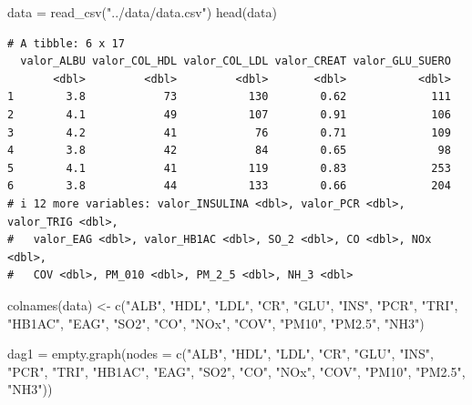 \documentclass[
  11pt,
  a4paper,
]{article}
\newenvironment{Shaded}{\begin{snugshade}}{\end{snugshade}}
\newcommand{\AttributeTok}[1]{\textcolor[rgb]{0.40,0.45,0.13}{#1}}
\newcommand{\FunctionTok}[1]{\textcolor[rgb]{0.28,0.35,0.67}{#1}}
\newcommand{\NormalTok}[1]{\textcolor[rgb]{0.00,0.23,0.31}{#1}}
\newcommand{\OtherTok}[1]{\textcolor[rgb]{0.00,0.23,0.31}{#1}}
\newcommand{\StringTok}[1]{\textcolor[rgb]{0.13,0.47,0.30}{#1}}
\begin{document}
\begin{Shaded}
\begin{Highlighting}[numbers=left,,]
\NormalTok{data }\OtherTok{=} \FunctionTok{read\_csv}\NormalTok{(}\StringTok{"../data/data.csv"}\NormalTok{)}
\FunctionTok{head}\NormalTok{(data)}
\end{Highlighting}
\end{Shaded}

\begin{verbatim}
# A tibble: 6 x 17
  valor_ALBU valor_COL_HDL valor_COL_LDL valor_CREAT valor_GLU_SUERO
       <dbl>         <dbl>         <dbl>       <dbl>           <dbl>
1        3.8            73           130        0.62             111
2        4.1            49           107        0.91             106
3        4.2            41            76        0.71             109
4        3.8            42            84        0.65              98
5        4.1            41           119        0.83             253
6        3.8            44           133        0.66             204
# i 12 more variables: valor_INSULINA <dbl>, valor_PCR <dbl>, valor_TRIG <dbl>,
#   valor_EAG <dbl>, valor_HB1AC <dbl>, SO_2 <dbl>, CO <dbl>, NOx <dbl>,
#   COV <dbl>, PM_010 <dbl>, PM_2_5 <dbl>, NH_3 <dbl>
\end{verbatim}

\begin{Shaded}
\begin{Highlighting}[numbers=left,,]
\FunctionTok{colnames}\NormalTok{(data) }\OtherTok{\textless{}{-}} \FunctionTok{c}\NormalTok{(}\StringTok{"ALB"}\NormalTok{, }\StringTok{"HDL"}\NormalTok{, }\StringTok{"LDL"}\NormalTok{, }\StringTok{"CR"}\NormalTok{, }\StringTok{"GLU"}\NormalTok{, }\StringTok{"INS"}\NormalTok{, }\StringTok{"PCR"}\NormalTok{, }\StringTok{"TRI"}\NormalTok{, }\StringTok{"HB1AC"}\NormalTok{, }\StringTok{"EAG"}\NormalTok{, }\StringTok{"SO2"}\NormalTok{, }\StringTok{"CO"}\NormalTok{, }\StringTok{"NOx"}\NormalTok{, }\StringTok{"COV"}\NormalTok{, }\StringTok{"PM10"}\NormalTok{, }\StringTok{"PM2.5"}\NormalTok{, }\StringTok{"NH3"}\NormalTok{)}
\end{Highlighting}
\end{Shaded}

\begin{Shaded}
\begin{Highlighting}[numbers=left,,]
\NormalTok{dag1 }\OtherTok{=} \FunctionTok{empty.graph}\NormalTok{(}\AttributeTok{nodes =} \FunctionTok{c}\NormalTok{(}\StringTok{"ALB"}\NormalTok{, }\StringTok{"HDL"}\NormalTok{, }\StringTok{"LDL"}\NormalTok{, }\StringTok{"CR"}\NormalTok{, }\StringTok{"GLU"}\NormalTok{, }\StringTok{"INS"}\NormalTok{, }\StringTok{"PCR"}\NormalTok{, }\StringTok{"TRI"}\NormalTok{, }\StringTok{"HB1AC"}\NormalTok{, }\StringTok{"EAG"}\NormalTok{, }\StringTok{"SO2"}\NormalTok{, }\StringTok{"CO"}\NormalTok{, }\StringTok{"NOx"}\NormalTok{, }\StringTok{"COV"}\NormalTok{, }\StringTok{"PM10"}\NormalTok{, }\StringTok{"PM2.5"}\NormalTok{, }\StringTok{"NH3"}\NormalTok{))}
\end{Highlighting}
\end{Shaded}
\end{document}

